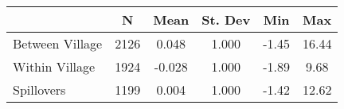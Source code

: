 \begin{tabular}{l*{5}{c}}\hline&\multicolumn{1}{c}{N}&\multicolumn{1}{c}{Mean}&\multicolumn{1}{c}{St. Dev}&\multicolumn{1}{c}{Min}&\multicolumn{1}{c}{Max}\\ \hline 
Between Village & 2126 & 0.048 & 1.000 & -1.45 & 16.44 \\
Within Village & 1924 & -0.028 & 1.000 & -1.89 & 9.68 \\
Spillovers & 1199 & 0.004 & 1.000 & -1.42 & 12.62 \\
\hline \end{tabular}

